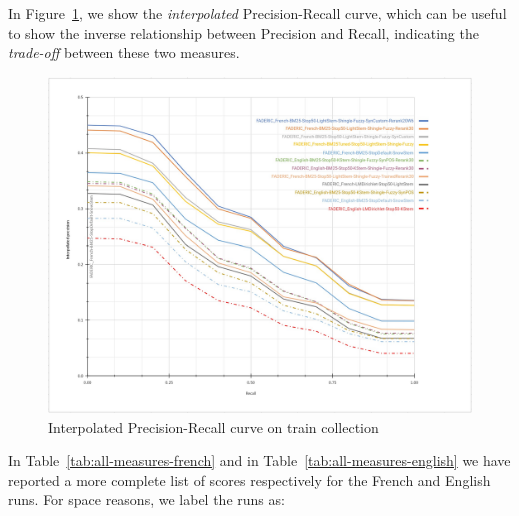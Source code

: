 In Figure~\ref{fig:precision-recall-curve}, we show the \emph{interpolated} Precision-Recall curve, which can be useful to show the inverse relationship between Precision and Recall, indicating the \emph{trade-off} between these two measures.

\begin{figure}[tbp]
  \centering
  \includegraphics[width=1\linewidth]{figure/prec-recall.jpg}
  \caption{Interpolated Precision-Recall curve on train collection}
  \label{fig:precision-recall-curve}
\end{figure}

\pagebreak

In Table~\ref{tab:all-measures-french} and in Table~\ref{tab:all-measures-english} we have reported a more complete list of scores respectively for the French and English runs. For space reasons, we label the runs as: 

